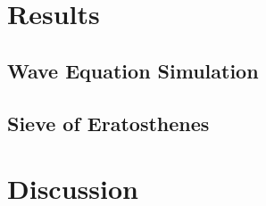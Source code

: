 \documentclass[a4paper,12px]{article}
\begin{document}
\section{Results}
\subsection{Wave Equation Simulation}
\subsection{Sieve of Eratosthenes}


\section{Discussion}




%
%
\end{document}

